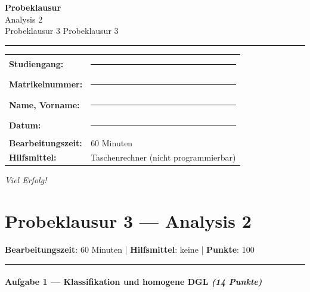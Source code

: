 \documentclass[11pt, a4paper]{article}
\providecommand{\nichttitle}{Probeklausur}
\providecommand{\nichtsubtitle}{}
\renewcommand{\nichttitle}{Analysis 2}
\renewcommand{\nichtsubtitle}{Probeklausur 3}
\begin{document}
\thispagestyle{empty}
\begin{center}
\vspace*{1cm}
{\Huge\bfseries\color{accent}Probeklausur}\\[8pt]
{\Large\color{accent}\nichttitle}\\[4pt]
\ifx\nichtsubtitle\empty\else
  {\large\color{accent!80!black}\nichtsubtitle}\\[6pt]
\fi
\color{accent}\rule{0.5\linewidth}{1pt}\color{black}
\end{center}

\vspace{1cm}
\begin{tabularx}{\textwidth}{@{}l X@{}}
\textbf{Studiengang:}      & \rule{6cm}{0.4pt} \\[6pt]
\textbf{Matrikelnummer:}    & \rule{6cm}{0.4pt} \\[6pt]
\textbf{Name, Vorname:}    & \rule{6cm}{0.4pt} \\[6pt]
\textbf{Datum:}             & \rule{6cm}{0.4pt} \\[6pt]
\textbf{Bearbeitungszeit:}  & 60 Minuten \\[6pt]
\textbf{Hilfsmittel:}       & Taschenrechner (nicht programmierbar) \\
\end{tabularx}

\vspace{2cm}
\begin{center}
{\large\itshape Viel Erfolg!}
\end{center}

\newpage


\section{Probeklausur 3 — Analysis 2}

\textbf{Bearbeitungszeit}: 60 Minuten | \textbf{Hilfsmittel}: keine | \textbf{Punkte}: 100



\noindent\textcolor{rulegray}{\rule{\linewidth}{0.4pt}}


\paragraph{Aufgabe 1 — Klassifikation und homogene DGL \textit{(14 Punkte)}}\mbox{}\\[2pt]
\end{document}
